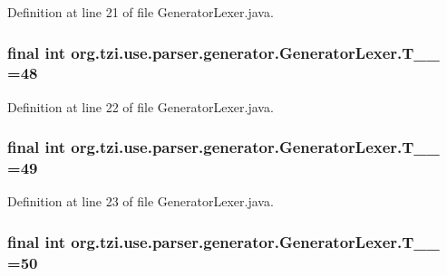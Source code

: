 Definition at line 21 of file Generator\-Lexer.\-java.

\hypertarget{classorg_1_1tzi_1_1use_1_1parser_1_1generator_1_1_generator_lexer_a16fd25fbdec117b88e865542506b3a35}{
\subsubsection[{T\-\_\-\-\_\-48}]{\setlength{\rightskip}{0pt plus 5cm}final int org.\-tzi.\-use.\-parser.\-generator.\-Generator\-Lexer.\-T\-\_\-\-\_ =48\hspace{0.3cm}{\ttfamily [static]}}}\label{classorg_1_1tzi_1_1use_1_1parser_1_1generator_1_1_generator_lexer_a16fd25fbdec117b88e865542506b3a35}


Definition at line 22 of file Generator\-Lexer.\-java.

\hypertarget{classorg_1_1tzi_1_1use_1_1parser_1_1generator_1_1_generator_lexer_a0d3776f81508efaef921d5eb5bbbf315}{
\subsubsection[{T\-\_\-\-\_\-49}]{\setlength{\rightskip}{0pt plus 5cm}final int org.\-tzi.\-use.\-parser.\-generator.\-Generator\-Lexer.\-T\-\_\-\-\_ =49\hspace{0.3cm}{\ttfamily [static]}}}\label{classorg_1_1tzi_1_1use_1_1parser_1_1generator_1_1_generator_lexer_a0d3776f81508efaef921d5eb5bbbf315}


Definition at line 23 of file Generator\-Lexer.\-java.

\hypertarget{classorg_1_1tzi_1_1use_1_1parser_1_1generator_1_1_generator_lexer_a3f83f2bacc66559746d44efe6f870a97}{
\subsubsection[{T\-\_\-\-\_\-50}]{\setlength{\rightskip}{0pt plus 5cm}final int org.\-tzi.\-use.\-parser.\-generator.\-Generator\-Lexer.\-T\-\_\-\-\_ =50\hspace{0.3cm}{\ttfamily [static]}}}\label{classorg_1_1tzi_1_1use_1_1parser_1_1generator_1_1_generator_lexer_a3f83f2bacc66559746d44efe6f870a97}


